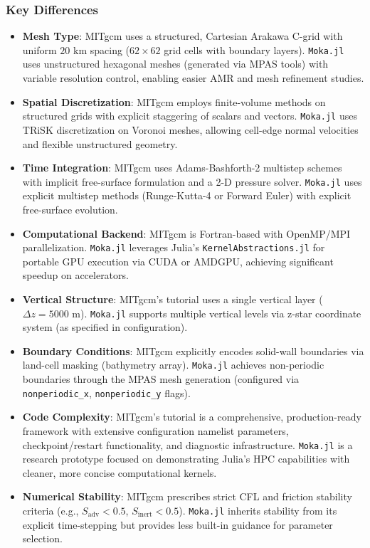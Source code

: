 \documentclass[12pt]{my-preprint}
\begin{document}
\subsubsection{Key Differences}

\begin{itemize}
    \item \textbf{Mesh Type}: MITgcm uses a structured, Cartesian Arakawa C-grid with uniform $20$ km spacing ($62 \times 62$ grid cells with boundary layers). \texttt{Moka.jl} uses unstructured hexagonal meshes (generated via MPAS tools) with variable resolution control, enabling easier AMR and mesh refinement studies.
    
    \item \textbf{Spatial Discretization}: MITgcm employs finite-volume methods on structured grids with explicit staggering of scalars and vectors. \texttt{Moka.jl} uses TRiSK discretization on Voronoi meshes, allowing cell-edge normal velocities and flexible unstructured geometry.
    
    \item \textbf{Time Integration}: MITgcm uses Adams-Bashforth-2 multistep schemes with implicit free-surface formulation and a 2-D pressure solver. \texttt{Moka.jl} uses explicit multistep methods (Runge-Kutta-4 or Forward Euler) with explicit free-surface evolution.
    
    \item \textbf{Computational Backend}: MITgcm is Fortran-based with OpenMP/MPI parallelization. \texttt{Moka.jl} leverages Julia's \texttt{KernelAbstractions.jl} for portable GPU execution via CUDA or AMDGPU, achieving significant speedup on accelerators.
    
    \item \textbf{Vertical Structure}: MITgcm's tutorial uses a single vertical layer ($\Delta z = 5000$ m). \texttt{Moka.jl} supports multiple vertical levels via z-star coordinate system (as specified in configuration).
    
    \item \textbf{Boundary Conditions}: MITgcm explicitly encodes solid-wall boundaries via land-cell masking (bathymetry array). \texttt{Moka.jl} achieves non-periodic boundaries through the MPAS mesh generation (configured via \texttt{nonperiodic\_x}, \texttt{nonperiodic\_y} flags).
    
    \item \textbf{Code Complexity}: MITgcm's tutorial is a comprehensive, production-ready framework with extensive configuration namelist parameters, checkpoint/restart functionality, and diagnostic infrastructure. \texttt{Moka.jl} is a research prototype focused on demonstrating Julia's HPC capabilities with cleaner, more concise computational kernels.
    
    \item \textbf{Numerical Stability}: MITgcm prescribes strict CFL and friction stability criteria (e.g., $S_{\text{adv}} < 0.5$, $S_{\text{inert}} < 0.5$). \texttt{Moka.jl} inherits stability from its explicit time-stepping but provides less built-in guidance for parameter selection.
\end{itemize}
\end{document}
